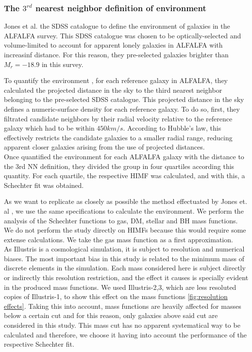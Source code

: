 \documentclass[a4paper,fleqn,usenatbib]{mnras}
\begin{document}
\subsubsection{The $3^{rd}$ nearest neighbor definition of environment}

Jones et al. \cite{jones1} the SDSS \cite{SDSS2011} catalogue to define the environment of galaxies in the ALFALFA \cite{ALFALFA} survey.
This SDSS catalogue was chosen to be optically-selected and volume-limited to account for apparent lonely galaxies in ALFALFA with increasinf distance. 
For this reason, they pre-selected galaxies brighter than $M_r = -18.9$ in this survey.

To quantify the environment , for each reference galaxy in ALFALFA, they calculated the projected distance in the sky to the third nearest neighbor belonging to the pre-selected SDSS catalogue.
This projected distance in the sky defines a numeric-surface density for each reference galaxy.
To do so, first, they filtrated candidate neighbors by their radial velocity relative to the reference galaxy which had to be within $450km/s$.
According to Hubble's law, this effectively restricts the candidate galaxies to a smaller radial range, reducing apparent closer galaxies arising from the use of projected distances. \\

Once quantified the environment for each ALFALFA galaxy with the distance to the 3rd NN definition, they divided the group in four quartiles according this quantity. 
For each quartile, the respective HIMF was calculated, and with this, a Schechter fit was obtained. 
 
As we want to replicate as closely as possible the method effectuated by Jones et. al \cite{jones1}, we use the same specifications to calculate the environment.
We perform the analysis of the Schechter functions to gas, DM, stellar and BH mass functions.
We do not perform the study directly on HIMFs because this would require some extense calculations. We take the gas mass function as a first approximation.\\

As Illustris is a cosmological simulation, it is subject to resolution and numerical biases.
The most important bias in this study is related to the minimum mass of discrete elements in the simulation.
Each mass considered here is subject directly or indirectly this resolution restriction, and the effect it causes is specially evident in the produced mass functions. 
We used Illustris-2,3, which are less resoluted copies of Illustris-1, to show this effect on the mass functions \ref{fig:resolution effects}. 
Taking this into account, mass functions are heavily affected for masses below a certain cut and for this reason, only galaxies above said cut are considered in this study.
This mass cut has no apparent systematical way to be calculated and therefore, we choose it having into account the performance of the respective Schechter fit.\\
\end{document}
